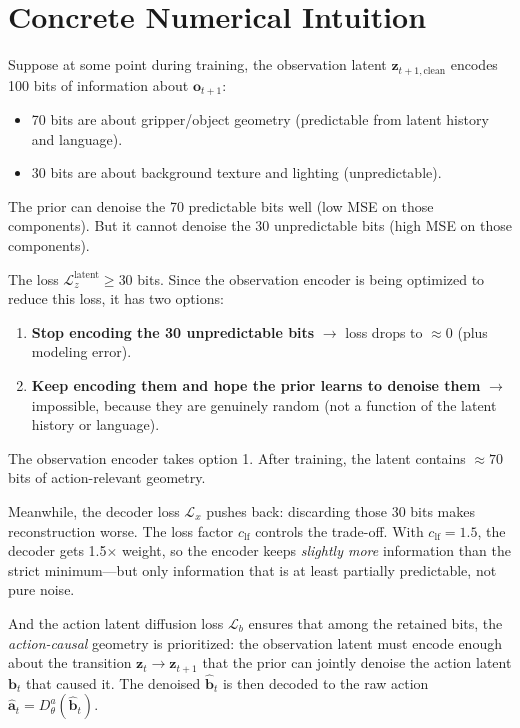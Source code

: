 \documentclass{article}
\newcommand{\vo}{\bm{o}}
\newcommand{\vz}{\bm{z}}
\newcommand{\va}{\bm{a}}
\newcommand{\vb}{\bm{b}}
\newcommand{\loss}{\mathcal{L}}
\begin{document}
\section{Concrete Numerical Intuition}

Suppose at some point during training, the observation latent $\vz_{t+1,\text{clean}}$ encodes 100 bits of information about $\vo_{t+1}$:
\begin{itemize}[leftmargin=*]
  \item 70 bits are about gripper/object geometry (predictable from latent history and language).
  \item 30 bits are about background texture and lighting (unpredictable).
\end{itemize}

The prior can denoise the 70 predictable bits well (low MSE on those components). But it cannot denoise the 30 unpredictable bits (high MSE on those components).

The loss $\loss_z^{\text{latent}} \geq 30$ bits. Since the observation encoder is being optimized to reduce this loss, it has two options:
\begin{enumerate}[leftmargin=*]
  \item \textbf{Stop encoding the 30 unpredictable bits} $\to$ loss drops to $\approx 0$ (plus modeling error).
  \item \textbf{Keep encoding them and hope the prior learns to denoise them} $\to$ impossible, because they are genuinely random (not a function of the latent history or language).
\end{enumerate}

The observation encoder takes option 1. After training, the latent contains $\approx 70$ bits of action-relevant geometry.

Meanwhile, the decoder loss $\loss_x$ pushes back: discarding those 30 bits makes reconstruction worse. The loss factor $c_{\text{lf}}$ controls the trade-off. With $c_{\text{lf}} = 1.5$, the decoder gets 1.5$\times$ weight, so the encoder keeps \emph{slightly more} information than the strict minimum---but only information that is at least partially predictable, not pure noise.

And the action latent diffusion loss $\loss_b$ ensures that among the retained bits, the \emph{action-causal} geometry is prioritized: the observation latent must encode enough about the transition $\vz_t \to \vz_{t+1}$ that the prior can jointly denoise the action latent $\vb_t$ that caused it. The denoised $\hat{\vb}_t$ is then decoded to the raw action $\hat{\va}_t = D_\theta^a(\hat{\vb}_t)$.
\end{document}
